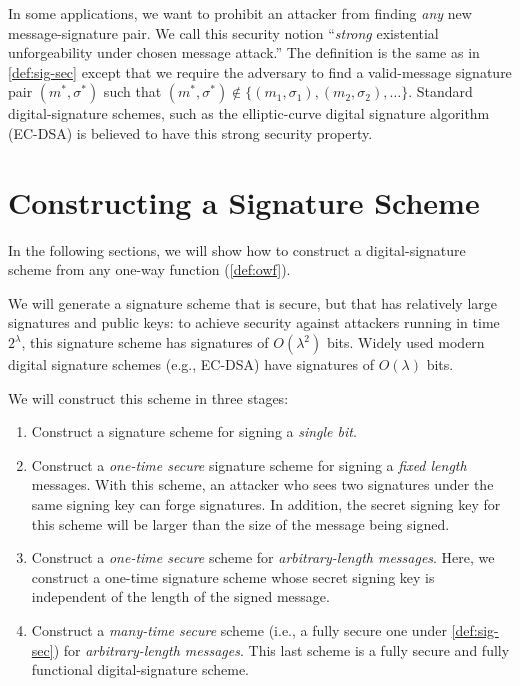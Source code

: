 In some applications, we want to prohibit an attacker from finding \emph{any}
new message-signature pair. We call this security notion ``\emph{strong} existential unforgeability under chosen message attack.''  
The definition is the same as in \cref{def:sig-sec} except that we require
the adversary to find a valid-message signature pair $(m^*, \sigma^*)$
such that $(m^*, \sigma^*) \not \in \{ (m_1, \sigma_1), (m_2, \sigma_2), \dots \}$.  Standard digital-signature schemes, such as the elliptic-curve digital signature
algorithm (EC-DSA) is believed to have this strong security property.

\section{Constructing a Signature Scheme}
In the following sections, we will show how to construct a digital-signature
scheme from any one-way function (\cref{def:owf}).

We will generate a signature scheme that is secure, but that has relatively large
signatures and public keys: to achieve security against attackers running
in time $2^\lambda$, this signature scheme has signatures of $O(\lambda^2)$ bits.
Widely used modern digital signature schemes (e.g., EC-DSA) have signatures
of $O(\lambda)$ bits.

We will construct this scheme in three stages:

\begin{enumerate}
	\item Construct a signature scheme for signing a \emph{single bit}.  

        \item Construct a \emph{one-time secure} signature scheme for signing a \emph{fixed length} messages.
        With this scheme, an attacker who sees two signatures under the same signing key can forge signatures.
        In addition, the secret signing key for this scheme will be larger than the size of the message 
        being signed.
      \item Construct a \emph{one-time secure} scheme for \emph{arbitrary-length messages}.
        Here, we construct a one-time signature scheme whose secret signing key is independent of 
        the length of the signed message.

      \item Construct a \emph{many-time secure} scheme (i.e., a fully secure one under 
        \cref{def:sig-sec}) for \emph{arbitrary-length messages}.
        This last scheme is a fully secure and fully functional digital-signature scheme.
\end{enumerate}

